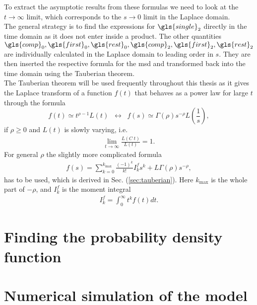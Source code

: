 To extract the asymptotic results from these formulas we need to look at the $t \to \infty$ limit, which corresponds to the $s \to 0$ limit in the Laplace domain. \\
The general strategy is to find the expressions for $\gls{single}_2$ directly in the time domain as it does not enter inside a product. The other quantities $\gls{comp}_0, \gls{first}_0, \gls{rest}_0, \gls{comp}_2, \gls{first}_2, \gls{rest}_2$ are individually calculated in the Laplace domain to leading order in $s$. They are then inserted the respective formula for the \gls{msd} and transformed back into the time domain using the Tauberian theorem. \\
The Tauberian theorem will be used frequently throughout this thesis as it gives the Laplace transform of a function $f(t)$ that behaves as a power law for large $t$ through the formula
% 
\begin{equation}
 f(t) \simeq t^{\rho-1} L(t) \;\; \leftrightarrow \;\; f(s) \simeq \Gamma(\rho) s^{-\rho} L\left(\frac{1}{s}\right) ,
\end{equation}
%
if $\rho \geq 0 $ and $L(t)$ is slowly varying, i.e.
%
\begin{align}
\lim_{t \to \infty} \frac{L(C \; t)}{L(t)} = 1 .
\end{align}
%
For general $\rho$ the slightly more complicated formula 
%
\begin{align}
 f(s) = \sum_{k=0}^{k_{\max}} \frac{(-1)^k}{k!} I^{f}_k s^k + L \Gamma(\rho) s^{-\rho} ,
 \label{eqn:tauberian}
\end{align}
%
has to be used, which is derived in Sec. (\ref{sec:tauberian}). Here $k_{\max}$ is the whole part of $-\rho$, and $I^{f}_k$ is the moment integral
%
\begin{align}
I^{f}_k = \int_0^\infty t^k f(t) dt.
\end{align}



\section{Finding the probability density function}

\section{Numerical simulation of the model}

